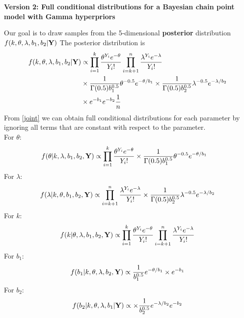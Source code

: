 \documentclass[11pt]{article}
\begin{document}
\pagestyle{empty}
\begin{center}
\Large
{\bf  Version 2: Full conditional distributions for a Bayesian chain point model with Gamma hyperpriors}\\
\end{center}
Our goal is to draw samples from the 5-dimensional
{\bf posterior} distribution $f(k,\theta,\lambda,b_1,b_2| {\bf Y})$  The posterior distribution is 
\begin{equation}\label{joint}
\begin{split}
f(k,\theta,\lambda,b_1,b_2| {\bf Y}) & \propto \prod_{i=1}^k \frac{\theta^{Y_i} e^{-\theta}}{Y_i !} \prod_{i=k+1}^n \frac{\lambda^{Y_i} e^{-\lambda}}{Y_i !} \\
& \times  \frac{1}{\Gamma(0.5)b_1^{0.5}} \theta^{-0.5} e^{-\theta/b_1} \times \frac{1}{\Gamma(0.5)b_2^{0.5}} \lambda^{-0.5} e^{-\lambda/b_2}\\ 
& \times e^{-b_1} e^{-b_2} \frac{1}{n}
\end{split}
\end{equation}
From \ref{joint} we can obtain full conditional distributions for each parameter by ignoring all terms that are constant with respect to the parameter.\\
For $\theta$:
\begin{equation}
\begin{split}
  f(\theta|k,\lambda,b_1,b_2,{\bf Y}) & \propto \prod_{i=1}^k
  \frac{\theta^{Y_i} e^{-\theta}}{Y_i !} \times
  \frac{1}{\Gamma(0.5)b_1^{0.5}} \theta^{-0.5} e^{-\theta/b_1}
\end{split}
\end{equation}
For $\lambda$:
\begin{equation}
f(\lambda|k,\theta,b_1,b_2,{\bf Y}) \propto \prod_{i=k+1}^n \frac{\lambda^{Y_i} e^{-\lambda}}{Y_i !} \times \frac{1}{\Gamma(0.5)b_2^{0.5}} \lambda^{-0.5} e^{-\lambda/b_2}
\end{equation}
For $k$:
\begin{equation}
f(k|\theta,\lambda,b_1,b_2,{\bf Y}) \propto \prod_{i=1}^k \frac{\theta^{Y_i} e^{-\theta}}{Y_i !} \prod_{i=k+1}^n \frac{\lambda^{Y_i} e^{-\lambda}}{Y_i !}
\end{equation}
For $b_1$:
\begin{equation}
f(b_1 | k,\theta,\lambda,b_2, {\bf Y}) \propto \frac{1}{b_1^{0.5}} e^{-\theta/b_1}\times e^{-b_1} 
\end{equation}
For $b_2$:
\begin{equation}
f(b_2 | k,\theta,\lambda,b_1| {\bf Y}) \propto \times \frac{1}{b_2^{0.5}} e^{-\lambda/b_2} e^{-b_2}
\end{equation}
\end{document}
